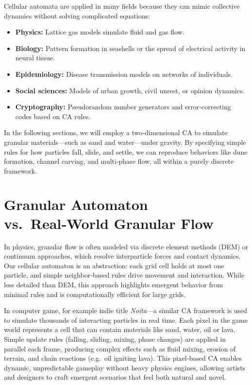 \documentclass{article}
\begin{document}
Cellular automata are applied in many fields because they can mimic collective dynamics without solving complicated equations:
\begin{itemize}
  \item \textbf{Physics:} Lattice gas models simulate fluid and gas flow.
  \item \textbf{Biology:} Pattern formation in seashells or the spread of electrical activity in neural tissue.
  \item \textbf{Epidemiology:} Disease transmission models on networks of individuals.
  \item \textbf{Social sciences:} Models of urban growth, civil unrest, or opinion dynamics.
  \item \textbf{Cryptography:} Pseudorandom number generators and error‑correcting codes based on CA rules.
\end{itemize}

In the following sections, we will employ a two‑dimensional CA to simulate granular materials—such as sand and water—under gravity. By specifying simple rules for how particles fall, slide, and settle, we can reproduce behaviors like dune formation, channel carving, and multi‑phase flow, all within a purely discrete framework.


\section{Granular Automaton vs.\ Real‑World Granular Flow}

In physics, granular flow is often modeled via discrete element methods (DEM) or continuum approaches, which resolve interparticle forces and contact dynamics. Our cellular automaton is an abstraction: each grid cell holds at most one particle, and simple neighbor‑based rules drive movement and interaction. While less detailed than DEM, this approach highlights emergent behavior from minimal rules and is computationally efficient for large grids.

In computer game, for example indie title \textit{Noita}—a similar CA framework is used to simulate thousands of interacting particles in real time. Each pixel in the game world represents a cell that can contain materials like sand, water, oil or lava. Simple update rules (falling, sliding, mixing, phase changes) are applied in parallel each frame, producing complex effects such as fluid mixing, erosion of terrain, and chain reactions (e.g.\ oil igniting lava). This pixel‑based CA enables dynamic, unpredictable gameplay without heavy physics engines, allowing artists and designers to craft emergent scenarios that feel both natural and novel.
\end{document}

